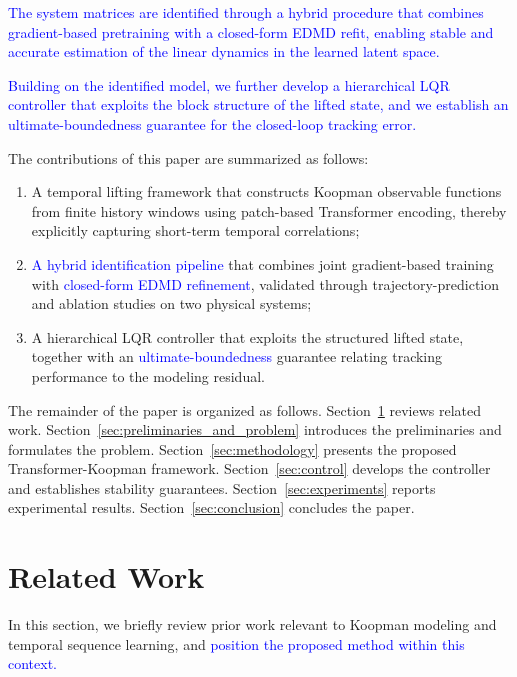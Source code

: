 \documentclass[journal]{IEEEtran}
\begin{document}
\textcolor{blue}{The system matrices are identified through a hybrid procedure that combines gradient-based pretraining with a closed-form EDMD refit, enabling stable and accurate estimation of the linear dynamics in the learned latent space.} 

\textcolor{blue}{Building on the identified model, we further develop a hierarchical LQR controller that exploits the block structure of the lifted state, and we establish an ultimate-boundedness guarantee for the closed-loop tracking error.}

The contributions of this paper are summarized as follows:
\begin{enumerate}
\item A temporal lifting framework that constructs Koopman observable functions from finite history windows using patch-based Transformer encoding, thereby explicitly capturing short-term temporal correlations;
\item \textcolor{blue}{A hybrid identification pipeline} that combines joint gradient-based training with \textcolor{blue}{closed-form EDMD refinement}, validated through trajectory-prediction and ablation studies on two physical systems;
\item A hierarchical LQR controller that exploits the structured lifted state, together with an \textcolor{blue}{ultimate-boundedness} guarantee relating tracking performance to the modeling residual.
\end{enumerate}

The remainder of the paper is organized as follows. Section~\ref{sec:related_work} reviews related work. Section~\ref{sec:preliminaries_and_problem} introduces the preliminaries and formulates the problem. Section~\ref{sec:methodology} presents the proposed Transformer-Koopman framework. Section~\ref{sec:control} develops the controller and establishes stability guarantees. Section~\ref{sec:experiments} reports experimental results. Section~\ref{sec:conclusion} concludes the paper.

\section{Related Work}
\label{sec:related_work}

In this section, we briefly review prior work relevant to Koopman modeling and temporal sequence learning, and \textcolor{blue}{position the proposed method within this context.}
\end{document}
